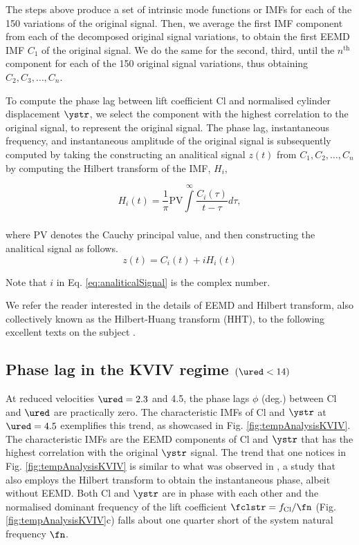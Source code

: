 \documentclass[a4paper,fleqn]{cas-sc}
\begin{document}
The steps above produce a set of intrinsic mode functions or IMFs for each of the 150 variations of the original signal. Then, we average the first IMF component from each of the decomposed original signal variations, to obtain the first EEMD IMF $C_{1}$ of the original signal. We do the same for the second, third, until the $n^{\text{th}}$ component for each of the 150 original signal variations, thus obtaining $C_{2},C_{3},\dots,C_{n}$.

To compute the phase lag between lift coefficient Cl and normalised cylinder displacement  $\ystr$, we select the component with the highest correlation to the original signal, to represent the original signal. The phase lag, instantaneous frequency, and instantaneous amplitude of the original signal is subsequently computed by taking the constructing an analitical signal $z \left( t \right)$ from $C_{1},C_{2},\dots,C_{n}$ by computing the Hilbert transform of the IMF, $H_{i}$,

\begin{equation}
  H_{i} \left( t \right) = \frac{1}{\pi} \text{PV} \int\limits_{}^{\infty} \frac{C_{i} \left( \tau \right)}{t - \tau} d\tau,
  \label{eq:hilbertTransform}
\end{equation}

\noindent where PV denotes the Cauchy principal value, and then constructing the analitical signal as follows.
\begin{equation}
  z \left( t \right) = C_{i} \left( t \right) + i H_{i} \left( t \right)
  \label{eq:analiticalSignal}
\end{equation}

\noindent Note that $i$ in Eq. \ref{eq:analiticalSignal} is the complex number.

We refer the reader interested in the details of EEMD and Hilbert transform, also collectively known as the Hilbert-Huang transform (HHT), to the following excellent texts on the subject \citep{Huang2005,Huang2014}.
\subsection{Phase lag in the KVIV regime $\left ( \ured < 14 \right )$} \label{ssec:phaseLag}
At reduced velocities  $\ured = 2.3$ and 4.5, the phase lags  $\phi$ (deg.) between Cl and  $\ured$ are practically zero. The characteristic IMFs of Cl and  $\ystr$ at $\ured = 4.5$ exemplifies this trend, as showcased in Fig. \ref{fig:tempAnalysisKVIV}. The characteristic IMFs are the EEMD components of Cl and  $\ystr$ that has the highest correlation with the original $\ystr$ signal. The trend that one notices in Fig. \ref{fig:tempAnalysisKVIV} is similar to what was observed in \citet{Khalak1999}, a study that also employs the Hilbert transform to obtain the instantaneous phase, albeit without EEMD. Both Cl and  $\ystr$ are in phase with each other and the normalised dominant frequency of the lift coefficient $\fclstr = f_{\text{Cl}}/\fn$ (Fig. \ref{fig:tempAnalysisKVIV}c) falls about one quarter short of the system natural frequency  $\fn$.
\end{document}
